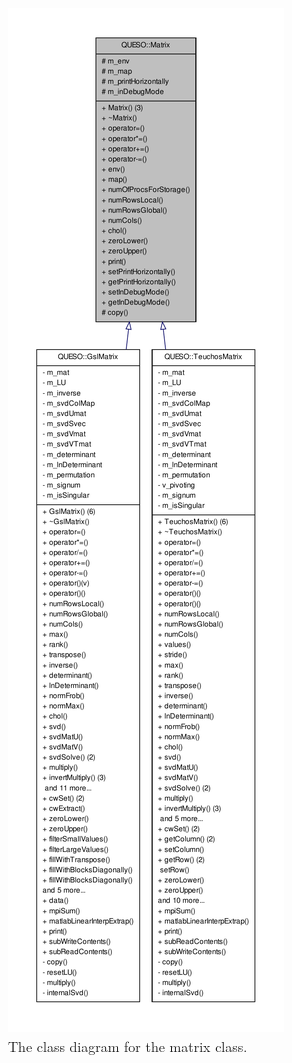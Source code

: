 \begin{figure}[!hp]
\centering
\vspace*{-.8cm}
\includegraphics[scale=0.50,clip=true]{rawfigs/matrix}
\vspace*{-.8cm}
\caption{The class diagram for the matrix class.}%
\label{fig-matrix-class}
\end{figure}


